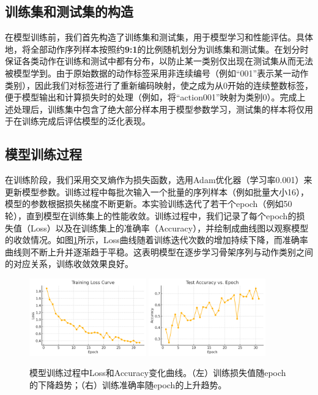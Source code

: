 \documentclass[UTF8]{article}
\begin{document}
\subsection{训练集和测试集的构造}

在模型训练前，我们首先构造了训练集和测试集，用于模型学习和性能评估。具体地，将全部动作序列样本按照约\textbf{9:1}的比例随机划分为训练集和测试集。在划分时保证各类动作在训练和测试中都有分布，以防止某一类别仅出现在测试集从而无法被模型学到。由于原始数据的动作标签采用非连续编号（例如``001''表示某一动作类别），因此我们对标签进行了重新编码映射，使之成为从0开始的连续整数标签，便于模型输出和计算损失时的处理（例如，将``action001''映射为类别0）。完成上述处理后，训练集中包含了绝大部分样本用于模型参数学习，测试集的样本将仅用于在训练完成后评估模型的泛化表现。

\subsection{模型训练过程}

在训练阶段，我们采用交叉熵作为损失函数，选用Adam优化器（学习率0.001）来更新模型参数。训练过程中每批次输入一个批量的序列样本（例如批量大小16），模型的参数根据损失梯度不断更新。本实验训练迭代了若干个epoch（例如50轮），直到模型在训练集上的性能收敛。训练过程中，我们记录了每个epoch的损失值（Loss）以及在训练集上的准确率（Accuracy），并绘制成曲线图以观察模型的收敛情况。如图\ref{fig:train}所示，Loss曲线随着训练迭代次数的增加持续下降，而准确率曲线则不断上升并逐渐趋于平稳。这表明模型在逐步学习骨架序列与动作类别之间的对应关系，训练收敛效果良好。

\begin{figure}[htbp]
    \centering
    \includegraphics[width=0.45\textwidth]{loss_curve.png}
    \quad
    \includegraphics[width=0.45\textwidth]{acc_curve.png}
    \caption{模型训练过程中Loss和Accuracy变化曲线。（左）训练损失值随epoch的下降趋势；（右）训练准确率随epoch的上升趋势。}
    \label{fig:train}
\end{figure}
\end{document}
